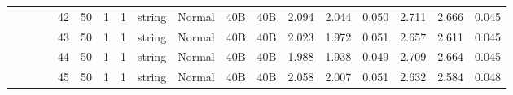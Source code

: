 \begin{landscape}
\begin{table}[]
{\begin{tabular}{@{}ccccllllllllllllll@{}}
                                                                                   &                              &                                &                                                                                                          & 42                                                    & 50                                       & 1                                          & 1                                 & string                           & Normal                             & 40B                                           & 40B                                             & 2.094                   & 2.044    & 0.050                        & 2.711                   & 2.666    & 0.045                        \\
                                                                                   &                              &                                &                                                                                                          & 43                                                    & 50                                       & 1                                          & 1                                 & string                           & Normal                             & 40B                                           & 40B                                             & 2.023                   & 1.972    & 0.051                        & 2.657                   & 2.611    & 0.045                        \\
                                                                                   &                              &                                &                                                                                                          & 44                                                    & 50                                       & 1                                          & 1                                 & string                           & Normal                             & 40B                                           & 40B                                             & 1.988                   & 1.938    & 0.049                        & 2.709                   & 2.664    & 0.045                        \\
                                                                                   &                              &                                &                                                                                                          & 45                                                    & 50                                       & 1                                          & 1                                 & string                           & Normal                             & 40B                                           & 40B                                             & 2.058                   & 2.007    & 0.051                        & 2.632                   & 2.584    & 0.048                        \\

\end{tabular}}
\end{table}
\end{landscape}
